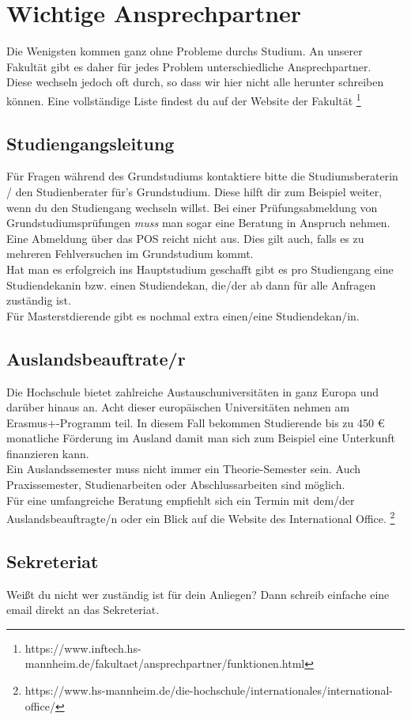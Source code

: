 \section*{Wichtige Ansprechpartner}
Die Wenigsten kommen ganz ohne Probleme durchs Studium.
An unserer Fakultät gibt es daher für jedes Problem unterschiedliche Ansprechpartner.
\\
Diese wechseln jedoch oft durch, so dass wir hier nicht alle herunter schreiben können.
Eine vollständige Liste findest du auf der Website der Fakultät \footnote{https://www.inftech.hs-mannheim.de/fakultaet/ansprechpartner/funktionen.html}

\subsection*{Studiengangsleitung}
Für Fragen während des Grundstudiums kontaktiere bitte die Studiumsberaterin / den Studienberater für's Grundstudium.
Diese hilft dir zum Beispiel weiter, wenn du den Studiengang wechseln willst. 
Bei einer Prüfungsabmeldung von Grundstudiumsprüfungen \textit{muss} man sogar eine Beratung in Anspruch nehmen.
Eine Abmeldung über das POS reicht nicht aus.
Dies gilt auch, falls es zu mehreren Fehlversuchen im Grundstudium kommt.
\\
Hat man es erfolgreich ins Hauptstudium geschafft gibt es pro Studiengang eine Studiendekanin bzw. einen Studiendekan, die/der ab dann für alle Anfragen zuständig ist.
\\
Für Masterstdierende gibt es nochmal extra einen/eine Studiendekan/in.

\subsection*{Auslandsbeauftrate/r}
Die Hochschule bietet zahlreiche Austauschuniversitäten in ganz Europa und darüber hinaus an.
Acht dieser europäischen Universitäten nehmen am Erasmus+-Programm teil.
In diesem Fall bekommen Studierende bis zu 450 € monatliche Förderung im Ausland damit man sich zum Beispiel eine Unterkunft finanzieren kann. 
\\
Ein Auslandssemester muss nicht immer ein Theorie-Semester sein.
Auch Praxissemester, Studienarbeiten oder Abschlussarbeiten sind möglich.
\\
Für eine umfangreiche Beratung empfiehlt sich ein Termin mit dem/der Auslandsbeauftragte/n oder ein Blick auf die Website des International Office. \footnote{https://www.hs-mannheim.de/die-hochschule/internationales/international-office/}

\subsection*{Sekreteriat}
Weißt du nicht wer zuständig ist für dein Anliegen?
Dann schreib einfache eine email direkt an das Sekreteriat.
